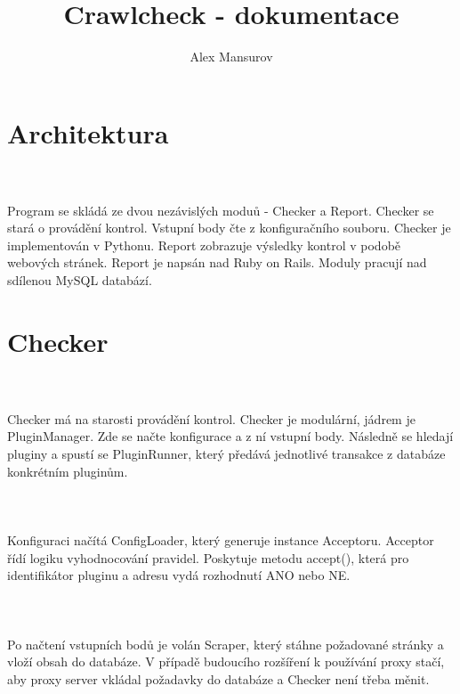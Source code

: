 \documentclass[10pt]{article}
\begin{document}
\title{Crawlcheck - dokumentace}
\author{Alex Mansurov}
\maketitle
\newpage

\section{Architektura}
\paragraph{~}Program se skl\'ad\'a ze dvou nez\'avisl\'ych modu\r{u} - Checker a Report. Checker se star\'a o prov\'ad\v{e}n\'i kontrol. Vstupn\'i body \v{c}te z konfigura\v{c}n\'iho souboru. Checker je implementov\'an v Pythonu. Report zobrazuje v\'ysledky kontrol v podob\v{e} webov\'ych str\'anek. Report je naps\'an nad Ruby on Rails. Moduly pracuj\'i nad sd\'ilenou MySQL datab\'az\'i.

\section{Checker}
\paragraph{~}Checker m\'a na starosti prov\'ad\v{e}n\'i kontrol. Checker je modul\'arn\'i, j\'adrem je PluginManager. Zde se na\v{c}te konfigurace a z n\'i vstupn\'i body. N\'asledn\v{e} se hledaj\'i pluginy a spust\'i se PluginRunner, kter\'y p\v{r}ed\'av\'a jednotliv\'e transakce z datab\'aze konkr\'etn\'im plugin\r{u}m.
\paragraph{~}Konfiguraci na\v{c}\'it\'a ConfigLoader, kter\'y generuje instance Acceptoru. Acceptor \v{r}\'id\'i logiku vyhodnocov\'an\'i pravidel. Poskytuje metodu accept(), kter\'a pro identifik\'ator pluginu a adresu vyd\'a rozhodnut\'i ANO nebo NE.
\paragraph{~}Po na\v{c}ten\'i vstupn\'ich bod\r{u} je vol\'an Scraper, kter\'y st\'ahne po\v{z}adovan\'e str\'anky a vlo\v{z}\'i obsah do datab\'aze. V p\v{r}\'ipad\v{e} budouc\'iho roz\v{s}\'i\v{r}en\'i k pou\v{z}\'iv\'an\'i proxy sta\v{c}\'i, aby proxy server vkl\'adal po\v{z}adavky do datab\'aze a Checker nen\'i t\v{r}eba m\v{e}nit.
\end{document}
